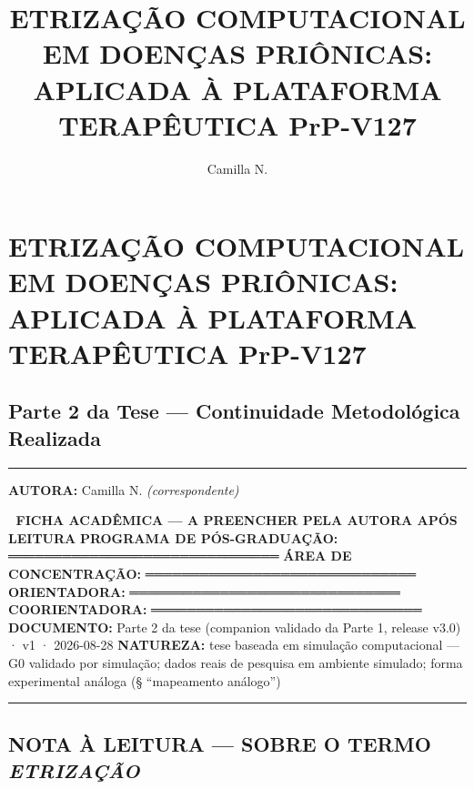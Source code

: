 \documentclass[
  10pt,
]{article}
\title{ETRIZAÇÃO COMPUTACIONAL EM DOENÇAS PRIÔNICAS: APLICADA À
PLATAFORMA TERAPÊUTICA PrP-V127}
\author{Camilla N.}
\date{}
\begin{document}
\maketitle

{
\setcounter{tocdepth}{3}
\tableofcontents
}
\hypertarget{etrizauxe7uxe3o-computacional-em-doenuxe7as-priuxf4nicas-aplicada-uxe0-plataforma-terapuxeautica-prp-v127}{%
\section{ETRIZAÇÃO COMPUTACIONAL EM DOENÇAS PRIÔNICAS: APLICADA À
PLATAFORMA TERAPÊUTICA
PrP-V127}\label{etrizauxe7uxe3o-computacional-em-doenuxe7as-priuxf4nicas-aplicada-uxe0-plataforma-terapuxeautica-prp-v127}}

\hypertarget{parte-2-da-tese-continuidade-metodoluxf3gica-realizada}{%
\subsection{Parte 2 da Tese --- Continuidade Metodológica
Realizada}\label{parte-2-da-tese-continuidade-metodoluxf3gica-realizada}}

\begin{center}\rule{0.5\linewidth}{0.5pt}\end{center}

\textbf{AUTORA:} Camilla N. \emph{(correspondente)}

🔖 \textbf{FICHA ACADÊMICA --- A PREENCHER PELA AUTORA APÓS LEITURA}
\textbf{PROGRAMA DE PÓS-GRADUAÇÃO:} ══════════════════════════════
\textbf{ÁREA DE CONCENTRAÇÃO:} ══════════════════════════════
\textbf{ORIENTADORA:} ══════════════════════════════
\textbf{COORIENTADORA:} ══════════════════════════════
\textbf{DOCUMENTO:} Parte 2 da tese (companion validado da Parte 1,
release v3.0) · v1 · 2026-08-28 \textbf{NATUREZA:} tese baseada em
simulação computacional --- G0 validado por simulação; dados reais de
pesquisa em ambiente simulado; forma experimental análoga (§
``mapeamento análogo'')

\begin{center}\rule{0.5\linewidth}{0.5pt}\end{center}

\hypertarget{nota-uxe0-leitura-sobre-o-termo-etrizauxe7uxe3o}{%
\subsection{\texorpdfstring{NOTA À LEITURA --- SOBRE O TERMO
\emph{ETRIZAÇÃO}}{NOTA À LEITURA --- SOBRE O TERMO ETRIZAÇÃO}}\label{nota-uxe0-leitura-sobre-o-termo-etrizauxe7uxe3o}}
\end{document}
